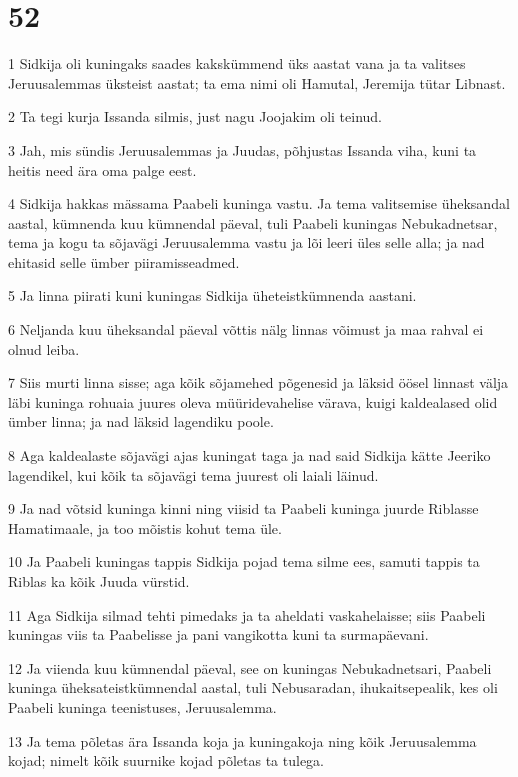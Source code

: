 \chapter{52}

\par 1 Sidkija oli kuningaks saades kakskümmend üks aastat vana ja ta valitses Jeruusalemmas üksteist aastat; ta ema nimi oli Hamutal, Jeremija tütar Libnast.
\par 2 Ta tegi kurja Issanda silmis, just nagu Joojakim oli teinud.
\par 3 Jah, mis sündis Jeruusalemmas ja Juudas, põhjustas Issanda viha, kuni ta heitis need ära oma palge eest.
\par 4 Sidkija hakkas mässama Paabeli kuninga vastu. Ja tema valitsemise üheksandal aastal, kümnenda kuu kümnendal päeval, tuli Paabeli kuningas Nebukadnetsar, tema ja kogu ta sõjavägi Jeruusalemma vastu ja lõi leeri üles selle alla; ja nad ehitasid selle ümber piiramisseadmed.
\par 5 Ja linna piirati kuni kuningas Sidkija üheteistkümnenda aastani.
\par 6 Neljanda kuu üheksandal päeval võttis nälg linnas võimust ja maa rahval ei olnud leiba.
\par 7 Siis murti linna sisse; aga kõik sõjamehed põgenesid ja läksid öösel linnast välja läbi kuninga rohuaia juures oleva müüridevahelise värava, kuigi kaldealased olid ümber linna; ja nad läksid lagendiku poole.
\par 8 Aga kaldealaste sõjavägi ajas kuningat taga ja nad said Sidkija kätte Jeeriko lagendikel, kui kõik ta sõjavägi tema juurest oli laiali läinud.
\par 9 Ja nad võtsid kuninga kinni ning viisid ta Paabeli kuninga juurde Riblasse Hamatimaale, ja too mõistis kohut tema üle.
\par 10 Ja Paabeli kuningas tappis Sidkija pojad tema silme ees, samuti tappis ta Riblas ka kõik Juuda vürstid.
\par 11 Aga Sidkija silmad tehti pimedaks ja ta aheldati vaskahelaisse; siis Paabeli kuningas viis ta Paabelisse ja pani vangikotta kuni ta surmapäevani.
\par 12 Ja viienda kuu kümnendal päeval, see on kuningas Nebukadnetsari, Paabeli kuninga üheksateistkümnendal aastal, tuli Nebusaradan, ihukaitsepealik, kes oli Paabeli kuninga teenistuses, Jeruusalemma.
\par 13 Ja tema põletas ära Issanda koja ja kuningakoja ning kõik Jeruusalemma kojad; nimelt kõik suurnike kojad põletas ta tulega.

